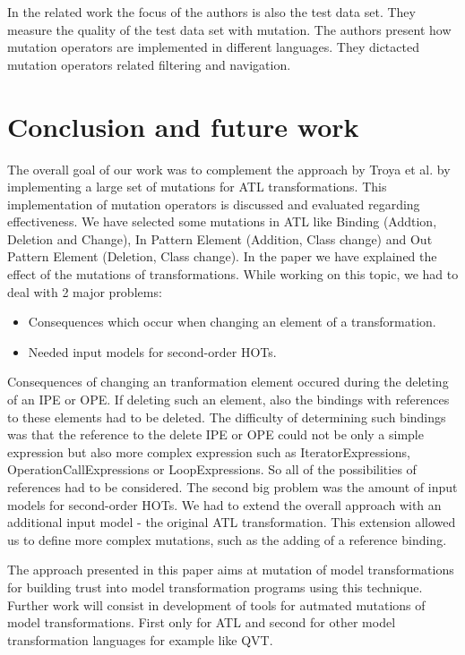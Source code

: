 \documentclass{llncs}
\begin{document}
In the related work \cite{Mottu:2006:MAT:2164453.2164495} the focus of the authors is also the test data set. They measure the quality of the test data set with mutation. The authors present how mutation operators are implemented in
different languages. They dictacted mutation operators related filtering and navigation. 

\section{Conclusion and future work}
The overall goal of our work was to complement the approach by Troya et al. \cite{Bergmayr:2014} by implementing a large set of mutations for ATL transformations. This implementation of mutation operators is discussed and evaluated regarding effectiveness. We have selected some mutations in ATL like Binding (Addtion, Deletion and Change), In Pattern Element (Addition, Class change) and Out Pattern Element (Deletion, Class change). In the paper we have explained the effect of the mutations of transformations.
While working on this topic, we had to deal with 2 major problems:

\begin{itemize}
	\item Consequences which occur when changing an element of a transformation.
	\item Needed input models for second-order HOTs.
\end{itemize}

Consequences of changing an tranformation element occured during the deleting of an IPE or OPE. If deleting such an element, also the bindings with references to these elements had to be deleted. The difficulty of determining such bindings was that the reference to the delete IPE or OPE could not be only a simple expression but also more complex expression such as IteratorExpressions, OperationCallExpressions or LoopExpressions. So all of the possibilities of references had to be considered.
The second big problem was the amount of input models for second-order HOTs.
We had to extend the overall approach with an additional input model - the original ATL transformation. This extension allowed us to define more complex mutations, such as the adding of a reference binding.

The approach presented in this paper aims at mutation of model transformations for building trust into model transformation programs using this technique. Further work will consist in development of tools for autmated mutations of model transformations. First only for ATL and second for other model transformation languages for example like QVT.

\newpage


\end{document}

